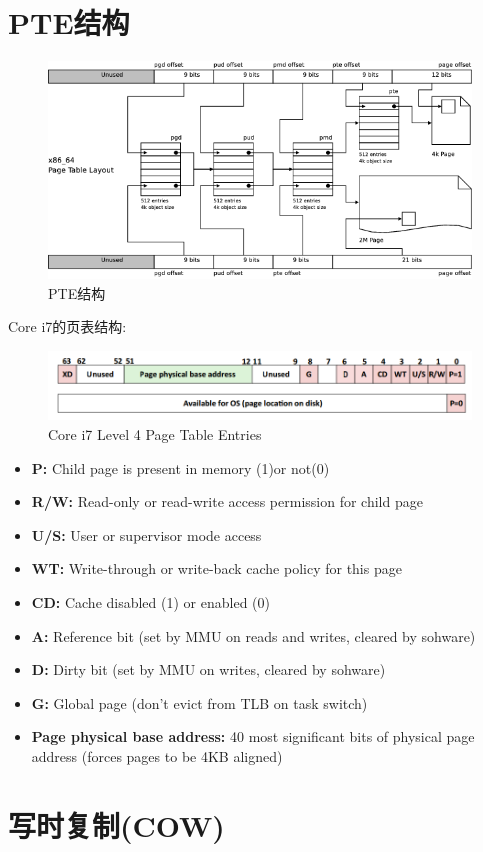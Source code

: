 \section{PTE结构}
\begin{figure}[htbp]
\begin{center}
\includegraphics[width=1\textwidth]{va-to-pa.png}
\caption{PTE结构\cite{linuxmm}}
\end{center}
\end{figure}



Core i7的页表结构:

\begin{figure}[htbp]
\begin{center}
\includegraphics[width=1\textwidth]{pte.png}
\caption{Core i7 Level 4 Page Table	Entries}
\end{center}
\end{figure}


\begin{itemize}
\item \textbf{P:} Child page is present in memory (1)or not(0)	
\item \textbf{R/W:} Read-only or read-write access permission for child page	
\item \textbf{U/S:} User or	supervisor mode	access	
\item \textbf{WT:} Write-through or	write-back cache policy for this page	
\item \textbf{CD:} Cache disabled (1) or	enabled (0)	
\item \textbf{A:} Reference bit (set by MMU on reads and	writes, cleared	by sohware)		
\item \textbf{D:} Dirty bit (set	by MMU on writes, cleared by sohware)	
\item \textbf{G:} Global	page (don’t	evict from TLB on task switch)	
\item \textbf{Page physical base address:} 40 most significant bits of physical page address (forces pages to be	4KB	aligned)	
\end{itemize}




\section{写时复制(COW)}
